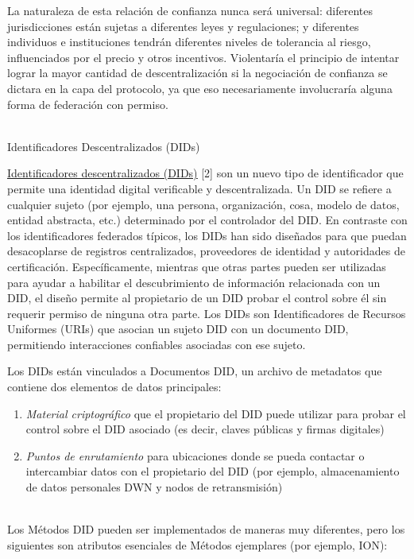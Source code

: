 \documentclass[11pt]{article}
\begin{document}
\vspace{1\baselineskip}
La naturaleza de esta relación de confianza nunca será universal: diferentes jurisdicciones están sujetas a diferentes leyes y regulaciones; y diferentes individuos e instituciones tendrán diferentes niveles de tolerancia al riesgo, influenciados por el precio y otros incentivos. Violentaría el principio de intentar lograr la mayor cantidad de descentralización si la negociación de confianza se dictara en la capa del protocolo, ya que eso necesariamente involucraría alguna forma de federación con permiso. 

{\LARGE  \\ Identificadores Descentralizados (DIDs)}

\vspace{1\baselineskip}
\href{https://www.w3.org/TR/did-core}{\uline{\textcolor[HTML]{1155CC}{Identificadores descentralizados (DIDs)}}} [2] son un nuevo tipo de identificador que permite una identidad digital verificable y descentralizada. Un DID se refiere a cualquier sujeto (por ejemplo, una persona, organización, cosa, modelo de datos, entidad abstracta, etc.) determinado por el controlador del DID. En contraste con los identificadores federados típicos, los DIDs han sido diseñados para que puedan desacoplarse de registros centralizados, proveedores de identidad y autoridades de certificación. Específicamente, mientras que otras partes pueden ser utilizadas para ayudar a habilitar el descubrimiento de información relacionada con un DID, el diseño permite al propietario de un DID probar el control sobre él sin requerir permiso de ninguna otra parte. Los DIDs son Identificadores de Recursos Uniformes (URIs) que asocian un sujeto DID con un documento DID, permitiendo interacciones confiables asociadas con ese sujeto.

\vspace{1\baselineskip}
Los DIDs están vinculados a Documentos DID, un archivo de metadatos que contiene dos elementos de datos principales: \\ 

\begin{enumerate}
	\item \textit{Material criptográfico} que el propietario del DID puede utilizar para probar el control sobre el DID asociado (es decir, claves públicas y firmas digitales) 

	\item \textit{Puntos de enrutamiento} para ubicaciones donde se pueda contactar o intercambiar datos con el propietario del DID (por ejemplo, almacenamiento de datos personales DWN y nodos de retransmisión)

\end{enumerate}
 \\ Los Métodos DID pueden ser implementados de maneras muy diferentes, pero los siguientes son atributos esenciales de Métodos ejemplares (por ejemplo, ION): \\ 
\end{document}
